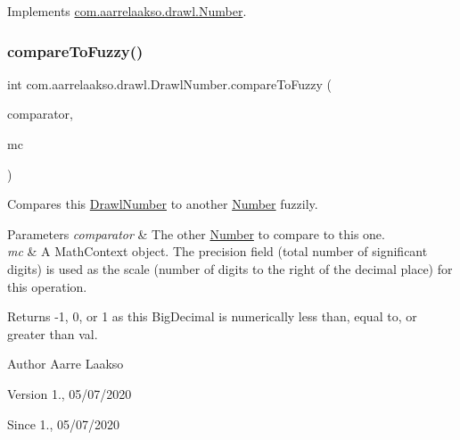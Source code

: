 Implements \hyperlink{interfacecom_1_1aarrelaakso_1_1drawl_1_1_number_abe6993852fed7bc6f13dbda74b78dde3}{com.\+aarrelaakso.\+drawl.\+Number}.

\mbox{\label{classcom_1_1aarrelaakso_1_1drawl_1_1_drawl_number_a67bb221c313ba22d920db646d130d66f}} 
\subsubsection{\texorpdfstring{compare\+To\+Fuzzy()}{compareToFuzzy()}\hspace{0.1cm}{\footnotesize\ttfamily [2/2]}}
{\footnotesize\ttfamily int com.\+aarrelaakso.\+drawl.\+Drawl\+Number.\+compare\+To\+Fuzzy (\begin{DoxyParamCaption}\item[{@Not\+Null final \hyperlink{interfacecom_1_1aarrelaakso_1_1drawl_1_1_number}{Number}}]{comparator,  }\item[{final Math\+Context}]{mc }\end{DoxyParamCaption})}



Compares this \hyperlink{classcom_1_1aarrelaakso_1_1drawl_1_1_drawl_number}{Drawl\+Number} to another \hyperlink{interfacecom_1_1aarrelaakso_1_1drawl_1_1_number}{Number} fuzzily. 


\begin{DoxyParams}{Parameters}
{\em comparator} & The other \hyperlink{interfacecom_1_1aarrelaakso_1_1drawl_1_1_number}{Number} to compare to this one. \\
\hline
{\em mc} & A Math\+Context object. The precision field (total number of significant digits) is used as the scale (number of digits to the right of the decimal place) for this operation. \\
\hline
\end{DoxyParams}
\begin{DoxyReturn}{Returns}
-\/1, 0, or 1 as this Big\+Decimal is numerically less than, equal to, or greater than val. 
\end{DoxyReturn}
\begin{DoxyAuthor}{Author}
Aarre Laakso 
\end{DoxyAuthor}
\begin{DoxyVersion}{Version}
1., 05/07/2020 
\end{DoxyVersion}
\begin{DoxySince}{Since}
1., 05/07/2020 
\end{DoxySince}


